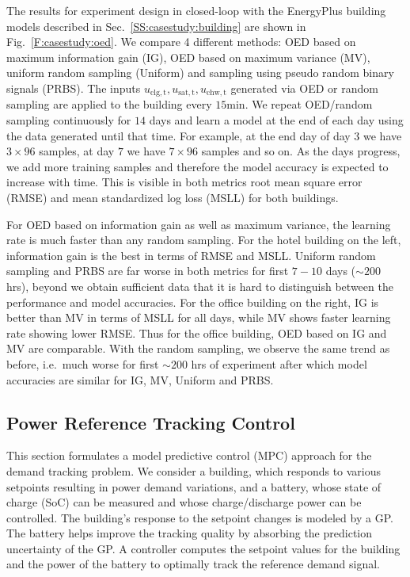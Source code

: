 The results for experiment design in closed-loop with the EnergyPlus building models described in Sec.~\ref{SS:casestudy:building} are shown in Fig.~\ref{F:casestudy:oed}.
We compare 4 different methods: OED based on maximum information gain (IG), OED based on maximum variance (MV), uniform random sampling (Uniform) and sampling using pseudo random binary signals (PRBS).
The inputs \(u_{\mathrm{clg,t}},u_{\mathrm{sat,t}},u_{\mathrm{chw,t}}\) generated via OED or random sampling are applied to the building every \(15 \mathrm{min}\).
We repeat OED/random sampling continuously for \(14\) days and learn a model at the end of each day using the data generated until that time. 
For example, at the end day of day \(3\) we have \(3\times96\) samples, at day \(7\) we have \(7\times96\) samples and so on. 
As the days progress, we add more training samples and therefore the model accuracy is expected to increase with time. 
This is visible in both metrics root mean square error (RMSE) and mean standardized log loss (MSLL) for both buildings.

For OED based on information gain as well as maximum variance, the learning rate is much faster than any random sampling.
For the hotel building on the left, information gain is the best in terms of RMSE and MSLL.
Uniform random sampling and  PRBS are far worse in both metrics for first \(7-10\) days (\(\sim200\) hrs), beyond we obtain sufficient data that it is hard to distinguish between the performance and model accuracies.
For the office building on the right, IG is better than MV in terms of MSLL for all days, while MV shows faster learning rate showing lower RMSE. 
Thus for the office building, OED based on IG and MV are comparable. 
With the random sampling, we observe the same trend as before, i.e.~much worse for first \(\sim200\) hrs of experiment after which model accuracies are similar for IG, MV, Uniform and PRBS.

\subsection{Power Reference Tracking Control}
\label{SS:power_tracking}

This section formulates a model predictive control (MPC) approach for the demand tracking problem.
We consider a building, which responds to various setpoints resulting in power demand variations, and a battery, whose state of charge (SoC) can be measured and whose charge/discharge power can be controlled.
The building's response to the setpoint changes is modeled by a GP.
The battery helps improve the tracking quality by absorbing the prediction uncertainty of the GP.
A controller computes the setpoint values for the building and the power of the battery to optimally track the reference demand signal.

